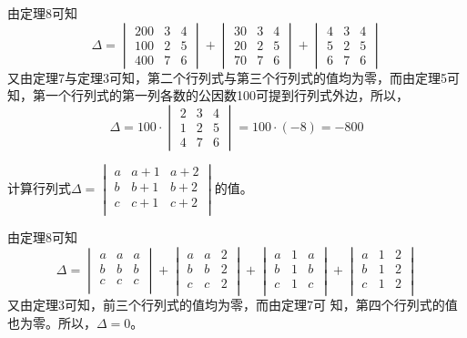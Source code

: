 \begin{solution}
由定理8可知
\[\Delta=\begin{vmatrix}
    200&3&4\\
    100&2&5\\
    400&7&6
\end{vmatrix}+\begin{vmatrix}
    30&3&4\\
    20&2&5\\
    70&7&6
\end{vmatrix}+\begin{vmatrix}
    4&3&4\\
    5&2&5\\
    6&7&6
\end{vmatrix}\]
又由定理7与定理3可知，第二个行列式与第三个行列式的值均为零，而由定理5可知，第一个行列式的第一列各数的公因数100可提到行列式外边，所以，
\[\Delta=100\cdot \begin{vmatrix}
    2&3&4\\
    1&2&5\\
    4&7&6
\end{vmatrix}=100\cdot (-8)=-800\]
\end{solution}

\begin{example}
计算行列式$\Delta=\begin{vmatrix}
        a&a+1&a+2\\
        b&b+1&b+2\\
        c&c+1&c+2\\
    \end{vmatrix}$的值。
\end{example}



\begin{solution}
由定理8可知
\[\Delta=\begin{vmatrix}
    a&a&a\\
    b&b&b\\
    c&c&c\\
\end{vmatrix}+\begin{vmatrix}
    a&a&2\\
    b&b&2\\
    c&c&2\\
\end{vmatrix}+\begin{vmatrix}
    a&1&a\\
    b&1&b\\
    c&1&c\\
\end{vmatrix}+\begin{vmatrix}
    a&1&2\\
    b&1&2\\
    c&1&2\\
\end{vmatrix}\]   
又由定理3可知，前三个行列式的值均为零，而由定理7可
知，第四个行列式的值也为零。所以，$\Delta=0$。  
\end{solution}

